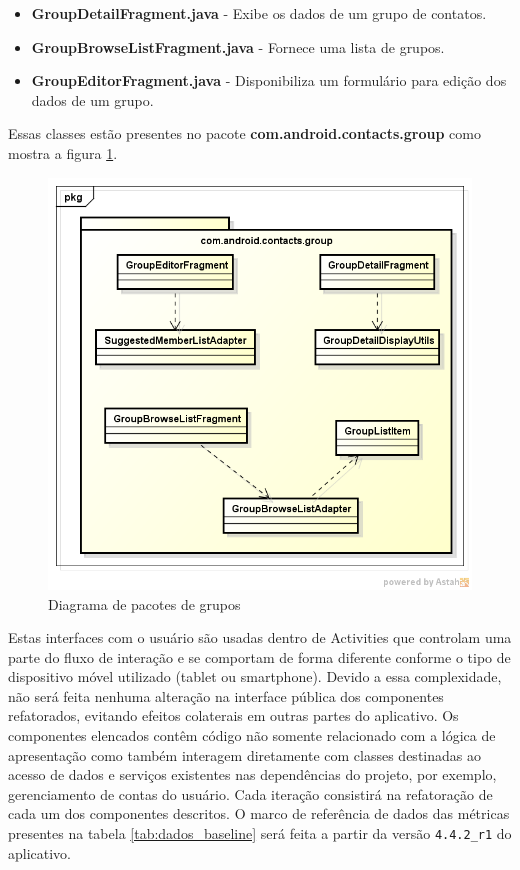 \documentclass[conference]{IEEEtran}
\begin{document}
\begin{itemize}
\item \textbf{GroupDetailFragment.java} -  Exibe os dados de um grupo de
contatos.
\item \textbf{GroupBrowseListFragment.java} - Fornece uma lista de grupos.
\item \textbf{GroupEditorFragment.java} - Disponibiliza um formulário para
edição dos dados de um grupo.
\end{itemize}

Essas classes estão presentes no pacote \textbf{com.android.contacts.group} como
mostra a figura \ref{fig:classes_group_baseline}.

\begin{figure}[htb]
	\begin{center}
		\includegraphics[scale=0.5]{img/classes_group_baseline.png}
	\end{center}
	\caption{\label{fig:classes_group_baseline} Diagrama de pacotes de grupos}   
	
\end{figure}

Estas interfaces com o usuário são usadas dentro de Activities que controlam uma
parte do fluxo de interação e se comportam de forma diferente conforme o tipo de dispositivo
móvel utilizado (tablet ou smartphone). Devido a essa complexidade, não será
feita nenhuma alteração na interface pública dos componentes refatorados, evitando efeitos colaterais em
outras partes do aplicativo. Os componentes elencados contêm código não somente
relacionado com a lógica de apresentação como também interagem diretamente com classes destinadas ao acesso
de dados e serviços existentes nas dependências do projeto, por exemplo,
gerenciamento de contas do usuário.  Cada iteração consistirá na refatoração de
cada um dos componentes descritos. O marco de referência de dados das métricas presentes na tabela \ref{tab:dados_baseline} será feita a partir da
versão \verb|4.4.2_r1| do aplicativo.
\end{document}
